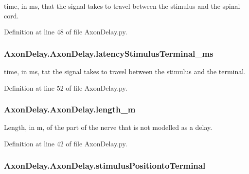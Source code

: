 time, in ms, that the signal takes to travel between the stimulus and the spinal cord. 



Definition at line 48 of file Axon\-Delay.\-py.

\hypertarget{class_axon_delay_1_1_axon_delay_a88845b9926b97db88174ce088d5af5e0}{
\subsubsection[{latency\-Stimulus\-Terminal\-\_\-ms}]{\setlength{\rightskip}{0pt plus 5cm}Axon\-Delay.\-Axon\-Delay.\-latency\-Stimulus\-Terminal\-\_\-ms}}\label{class_axon_delay_1_1_axon_delay_a88845b9926b97db88174ce088d5af5e0}


time, in ms, tat the signal takes to travel between the stimulus and the terminal. 



Definition at line 52 of file Axon\-Delay.\-py.

\hypertarget{class_axon_delay_1_1_axon_delay_a08ab7285929002db2108179ea9f5d5dd}{
\subsubsection[{length\-\_\-m}]{\setlength{\rightskip}{0pt plus 5cm}Axon\-Delay.\-Axon\-Delay.\-length\-\_\-m}}\label{class_axon_delay_1_1_axon_delay_a08ab7285929002db2108179ea9f5d5dd}


Length, in m, of the part of the nerve that is not modelled as a delay. 



Definition at line 42 of file Axon\-Delay.\-py.

\hypertarget{class_axon_delay_1_1_axon_delay_a3f6bb8f38c4474806544d01fbe9c0361}{
\subsubsection[{stimulus\-Positionto\-Terminal}]{\setlength{\rightskip}{0pt plus 5cm}Axon\-Delay.\-Axon\-Delay.\-stimulus\-Positionto\-Terminal}}\label{class_axon_delay_1_1_axon_delay_a3f6bb8f38c4474806544d01fbe9c0361}


